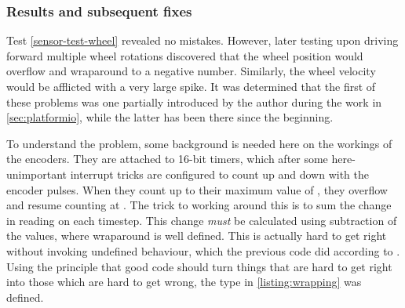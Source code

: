 \documentclass[main.tex]{subfiles}
\begin{document}
		\subsubsection{Results and subsequent fixes}

		Test \ref{sensor-test-wheel} revealed no mistakes.
		However, later testing upon driving forward multiple wheel rotations discovered that the wheel position would overflow and wraparound to a negative number. Similarly, the wheel velocity would be afflicted with a very large spike.
		It was determined that the first of these problems was one partially introduced by the author during the work in \cref{sec:platformio}, while the latter has been there since the beginning.

		To understand the problem, some background is needed here on the workings of the encoders.
		They are attached to 16-bit timers, which after some here-unimportant interrupt tricks are configured to count up and down with the encoder pulses. When they count up to their maximum value of , they overflow and resume counting at .
		The trick to working around this is to sum the change in reading on each timestep. This change \emph{must} be calculated using  subtraction of the values, where wraparound is well defined. This is actually hard to get right without invoking undefined behaviour, which the previous code did according to \cite[Paragraph~5/4]{cpp-standard}.
		Using the principle that good code should turn things that are hard to get right into those which are hard to get wrong, the type in \cref{listing:wrapping} was defined.
\end{document}
